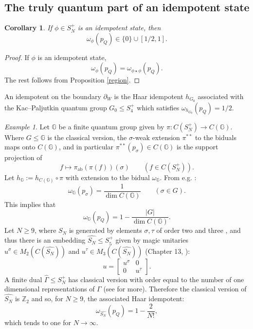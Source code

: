\documentclass[12pt]{amsart}
\newtheorem{corollary}[theorem]{Corollary}
\theoremstyle{remark}
\newtheorem{example}[theorem]{Example}
\theoremstyle{remark}
\begin{document}
\subsection{The truly quantum part of an idempotent state}
\begin{corollary}\label{idempot2}
If $\phi\in S_N^+$ is an idempotent state, then
$$\omega_\phi(p_Q)\in \{0\}\cup[1/2,1].$$
\end{corollary}
\begin{proof}
If $\phi$ is an idempotent state,
$$\omega_\phi(p_Q)=\omega_{\phi\star\phi}(p_Q).$$
The rest follows from Proposition \ref{region}.
\end{proof}
An idempotent on the boundary $\partial_{W}$ is the Haar idempotent $h_{G_0}$ associated with the Kac--Paljutkin quantum group $G_0\leq S_4^+$ which satisfies $\omega_{h_{G_0}}(p_Q)=1/2$.

\begin{example}\label{limit}
Let $\mathbb{G}$ be a finite quantum group given by $\pi:C(S_N^+)\to C(\mathbb{G})$. Where $G\leq \mathbb{G}$ is the classical version, the $\sigma$-weak extension $\pi^{**}$ to the biduals maps onto $C(\mathbb{G})$, and in particular $\pi^{**}(p_\sigma)\in C(\mathbb{G})$ is the support projection of
$$f\mapsto \pi_{\text{ab}}(\pi(f))(\sigma)\qquad(f\in C(S_N^+)).$$
Let $h_{\mathbb{G}}:=h_{C(\mathbb{G})}\circ \pi$ with extension to the bidual $\omega_{\mathbb{G}}$. From e.g. \cite{kpa}:
$$\omega_{\mathbb{G}}(p_\sigma)=\frac{1}{\dim C(\mathbb{G})}\qquad (\sigma\in G).$$
This implies that
\begin{equation}\omega_{\mathbb{G}}(p_Q)= 1-\frac{|G|}{\dim C(\mathbb{G})}.\label{finitech}\end{equation} Let $N\geq 9$, where $S_N$ is generated by elements $\sigma,\tau$ of order two and three \cite{mil}, and thus there is an embedding $\widehat{S_N}\leq S_5^+$ given by magic unitaries $u^\sigma\in M_2(C(\widehat{S_N}))$ and $u^\tau\in M_3(C(\widehat{S_N}))$ (Chapter 13, \cite{ba1}):
$$u=\begin{bmatrix}
      u^{\sigma} & 0 \\
      0 & u^{\tau}
    \end{bmatrix}.$$
A finite dual $\widehat{\Gamma}\leq S_N^+$ has classical version with order equal to the number of one dimensional representations of $\Gamma$ (see \cite{mcc} for more). Therefore the classical version of $\widehat{S_N}$ is $\mathbb{Z}_2$ and so, for $N\geq 9$, the associated Haar idempotent:
\begin{equation}\omega_{\widehat{S_N}}(p_Q)=1-\frac{2}{N!},\label{limpt}\end{equation}
which tends to one for $N\to \infty$.
\end{example}
\end{document}
